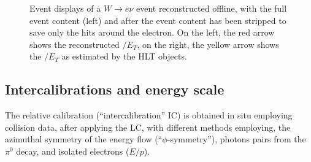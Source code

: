 \documentclass[journal]{IEEEtran}
\begin{document}
%
\begin{figure}[!t]
  \begin{center}
    \caption{Event displays of a $W\to e\nu$ event reconstructed offline, with the full event content (left) and after the event content has been stripped to save only the hits around the electron. On the left, the red arrow shows the reconstructed $\slash E_T$, on the right, the yellow arrow shows the $\slash E_T$ as estimated by the HLT objects. \label{fig:elestream}}
  \end{center}
\end{figure}
%


\subsection{Intercalibrations and energy scale}
The relative calibration (“intercalibration” IC) is obtained in situ employing collision data, after applying the LC, with different methods employing, the azimuthal symmetry of the energy flow (``$\phi$-symmetry''), photons pairs from the $\pi^0$ decay, and isolated electrons ($E/p$).
\end{document}
